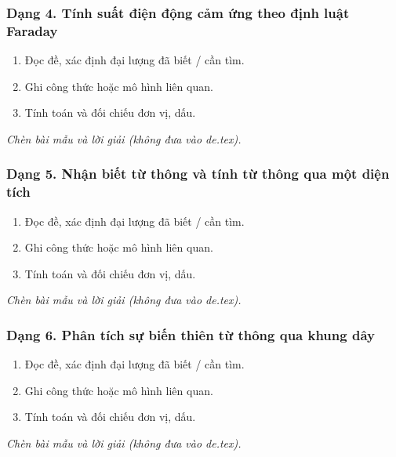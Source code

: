 \subsubsection{Dạng 4. Tính suất điện động cảm ứng theo định luật Faraday}
\begin{phuongphap}
\begin{enumerate}
\item Đọc đề, xác định đại lượng đã biết / cần tìm.
\item Ghi công thức hoặc mô hình liên quan.
\item Tính toán và đối chiếu đơn vị, dấu.
\end{enumerate}
\end{phuongphap}
\begin{vidumau}
\textit{Chèn bài mẫu và lời giải (không đưa vào de.tex).}
\end{vidumau}

\subsubsection{Dạng 5. Nhận biết từ thông và tính từ thông qua một diện tích}
\begin{phuongphap}
\begin{enumerate}
\item Đọc đề, xác định đại lượng đã biết / cần tìm.
\item Ghi công thức hoặc mô hình liên quan.
\item Tính toán và đối chiếu đơn vị, dấu.
\end{enumerate}
\end{phuongphap}
\begin{vidumau}
\textit{Chèn bài mẫu và lời giải (không đưa vào de.tex).}
\end{vidumau}

\subsubsection{Dạng 6. Phân tích sự biến thiên từ thông qua khung dây}
\begin{phuongphap}
\begin{enumerate}
\item Đọc đề, xác định đại lượng đã biết / cần tìm.
\item Ghi công thức hoặc mô hình liên quan.
\item Tính toán và đối chiếu đơn vị, dấu.
\end{enumerate}
\end{phuongphap}
\begin{vidumau}
\textit{Chèn bài mẫu và lời giải (không đưa vào de.tex).}
\end{vidumau}


